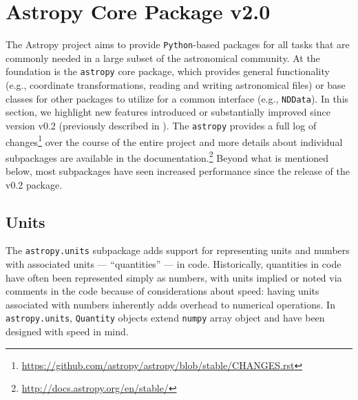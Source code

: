 \documentclass[modern]{aastex61}
\newcommand{\package}[1]{\texttt{#1}\xspace}
\newcommand{\python}{\package{Python}}
\newcommand{\astropy}{Astropy\xspace}
\newcommand{\astropypkg}{\package{astropy}}
\newcommand{\inlinecomment}[2]{\todo[inline]{#1: #2}\xspace}
\begin{document}
\section{Astropy Core Package v2.0}
\label{sec:core}
The \astropy project aims to provide \python-based packages for all tasks that
are commonly needed in a large subset of the astronomical community.
At the foundation is the \astropypkg core package, which provides general
functionality (e.g., coordinate transformations, reading and writing astronomical
files) or base classes for other
packages to utilize for a common interface (e.g., \texttt{NDData}).
In this section, we highlight new features introduced or substantially improved
since version v0.2 (previously described in \citealt{astropy}).  The \astropypkg
provides a full log of changes\footnote{\url{https://github.com/astropy/astropy/blob/stable/CHANGES.rst}}
over the course of the entire project and more details about individual
subpackages are available in the documentation.\footnote{\url{http://docs.astropy.org/en/stable/}}
Beyond what is mentioned below, most subpackages have seen increased performance
since the release of the v0.2 package.



\subsection{Units}\label{sec:units}

The \texttt{astropy.units} subpackage adds support for representing units and
numbers with associated units --- ``quantities'' --- in code.
Historically, quantities in code have often been represented simply as numbers,
with units implied or noted via comments in the code because of considerations
about speed: having units associated with numbers inherently adds overhead to
numerical operations.
In \texttt{astropy.units}, \texttt{Quantity} objects extend \texttt{numpy}
array object and have been designed with speed in mind.
\end{document}
